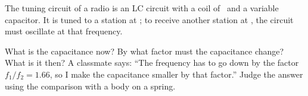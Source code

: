 The tuning circuit of a radio is an LC circuit with a coil of \LiO\ and a variable capacitor. It is tuned to a station at \faO; to receive another station at \fbO, the circuit must oscillate at that frequency.
\begin{abcliste}
\abc What is the capacitance now?
\abc By what factor must the capacitance change? What is it then?
\abc A classmate says: ``The frequency has to go down by the factor $f_1/f_2 = 1.66$, so I make the capacitance smaller by that factor.'' Judge the answer using the comparison with a body on a spring.
\end{abcliste}
